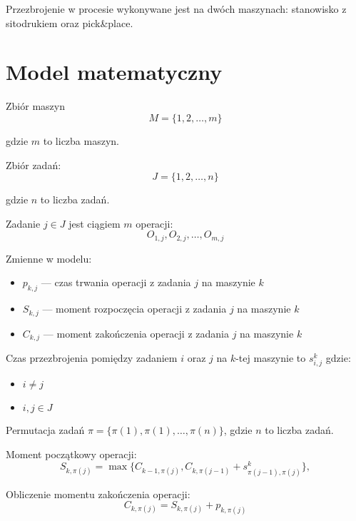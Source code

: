 Przezbrojenie w procesie wykonywane jest na dwóch maszynach: stanowisko z sitodrukiem oraz pick\&place.

\section{Model matematyczny}

\breakparagraph{}
Zbiór maszyn
\begin{equation}
	M=\lbrace 1, 2, \dots, m \rbrace
\end{equation}

gdzie $m$ to liczba maszyn.

\breakparagraph{}
Zbiór zadań:
\begin{equation}
	J=\lbrace 1, 2, \dots, n \rbrace
\end{equation}

gdzie $n$ to liczba zadań.

\breakparagraph{}
Zadanie $j \in J$ jest ciągiem $m$ operacji:
\begin{equation}
	O_{1, j}, O_{2, j}, \dots, O_{m, j}
\end{equation}

\breakparagraph{}
Zmienne w modelu:
\begin{itemize}
	\item $p_{k, j}$ --- czas trwania operacji z zadania $j$ na maszynie $k$
	\item $S_{k, j}$ --- moment rozpoczęcia operacji z zadania $j$ na maszynie $k$
	\item $C_{k, j}$ --- moment zakończenia operacji z zadania $j$ na maszynie $k$
\end{itemize}

\breakparagraph{}
Czas przezbrojenia pomiędzy zadaniem $i$ oraz $j$ na $k$-tej maszynie to $s_{i, j}^{k}$ gdzie:
\begin{itemize}
	\item $i \neq j$
	\item  $i, j \in J$
\end{itemize}

\breakparagraph{}
Permutacja zadań $\pi = \lbrace \pi(1), \pi(1), \dots, \pi(n) \rbrace$, gdzie $n$ to liczba zadań.

\breakparagraph{}
Moment początkowy operacji:
\begin{equation}
	S_{k, \pi(j)}=\max\{C_{k-1, \pi(j)}, C_{k, \pi(j-1)}+s^k_{\pi(j-1), \pi(j)}\},
\end{equation}

\breakparagraph{}
Obliczenie momentu zakończenia operacji:
\begin{equation}
	C_{k, \pi(j)} = S_{k, \pi(j)} + p_{k, \pi(j)}
\end{equation}

